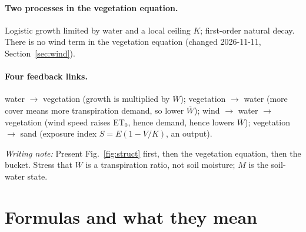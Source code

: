 \documentclass[11pt,a4paper]{article}
\newcommand{\Wb}{\overline W}
\newcommand{\say}[1]{\par\smallskip\noindent\textcolor{teal!70!black}{\textit{Writing note:} #1}\par\smallskip}
\begin{document}
\paragraph{Two processes in the vegetation equation.}
Logistic growth limited by water and a local ceiling $K$; first-order natural decay. There is no
wind term in the vegetation equation (changed 2026-11-11, Section~\ref{sec:wind}).

\paragraph{Four feedback links.}
water $\to$ vegetation (growth is multiplied by $\Wb$);
vegetation $\to$ water (more cover means more transpiration demand, so lower $\Wb$);
wind $\to$ water $\to$ vegetation (wind speed raises ET$_0$, hence demand, hence lowers $\Wb$);
vegetation $\to$ sand (exposure index $S=E(1-V/K)$, an output).

\say{Present Fig.~\ref{fig:struct} first, then the vegetation equation, then the bucket. Stress
that $\Wb$ is a transpiration ratio, not soil moisture; $M$ is the soil-water state.}

\section{Formulas and what they mean}\label{sec:eq}
\end{document}
